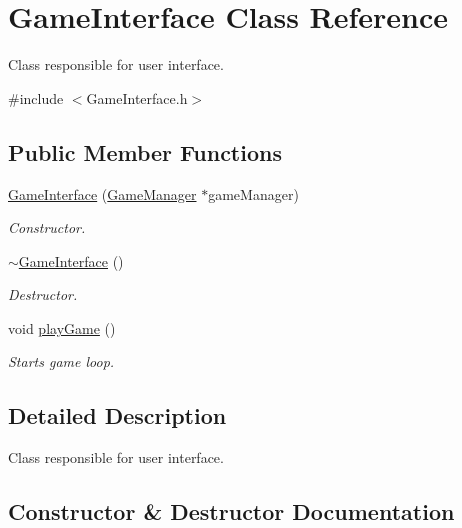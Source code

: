 \hypertarget{classGameInterface}{}\section{Game\+Interface Class Reference}
\label{classGameInterface}


Class responsible for user interface.  




{\ttfamily \#include $<$Game\+Interface.\+h$>$}

\subsection*{Public Member Functions}
\begin{DoxyCompactItemize}
\item 
\hyperlink{classGameInterface_acb731c8610dcb344635269863fc1c36d}{Game\+Interface} (\hyperlink{classGameManager}{Game\+Manager} $\ast$game\+Manager)
\begin{DoxyCompactList}\small\item\em Constructor. \end{DoxyCompactList}\item 
\mbox{\label{classGameInterface_af61f3f8a7da96ae1cbad04b6f400ab0a}} 
\hyperlink{classGameInterface_af61f3f8a7da96ae1cbad04b6f400ab0a}{$\sim$\+Game\+Interface} ()
\begin{DoxyCompactList}\small\item\em Destructor. \end{DoxyCompactList}\item 
\mbox{\label{classGameInterface_afa5ac9d56e2578c26acbf528946827f3}} 
void \hyperlink{classGameInterface_afa5ac9d56e2578c26acbf528946827f3}{play\+Game} ()
\begin{DoxyCompactList}\small\item\em Starts game loop. \end{DoxyCompactList}\end{DoxyCompactItemize}


\subsection{Detailed Description}
Class responsible for user interface. 

\subsection{Constructor \& Destructor Documentation}
\mbox{\label{classGameInterface_acb731c8610dcb344635269863fc1c36d}} 
